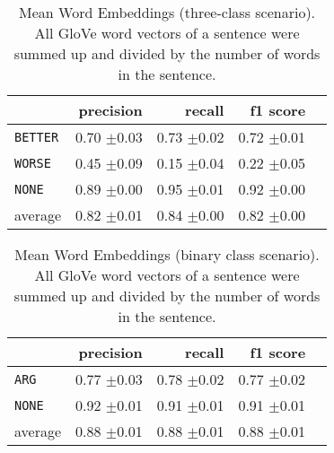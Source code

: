 	\begin{table}[htbp] 
		\centering 
		\caption{Mean Word Embeddings (three-class scenario). All GloVe word vectors of a sentence were summed up and divided by the number of words in the sentence.} 
		\label{  }
		\begin{tabular}{@{}lrrrr@{}}
			\toprule
			        & precision                & recall                   & f1 score                 \\ \midrule 
\texttt	{BETTER}	&	 0.70 \scriptsize{$\pm$0.03} &	 0.73 \scriptsize{$\pm$0.02} &	 0.72 \scriptsize{$\pm$0.01}  \\ 
\texttt	{WORSE}	&	 0.45 \scriptsize{$\pm$0.09} &	 0.15 \scriptsize{$\pm$0.04} &	 0.22 \scriptsize{$\pm$0.05}  \\ 
\texttt	{NONE}	&	 0.89 \scriptsize{$\pm$0.00} &	 0.95 \scriptsize{$\pm$0.01} &	 0.92 \scriptsize{$\pm$0.00}  \\ 
average	&	 0.82 \scriptsize{$\pm$0.01} &	 0.84 \scriptsize{$\pm$0.00} &	 0.82 \scriptsize{$\pm$0.00}  \\ 
			\bottomrule
		\end{tabular}
	\end{table}
	
	\begin{table}[htbp] 
		\centering 
		\caption{Mean Word Embeddings (binary class scenario). All GloVe word vectors of a sentence were summed up and divided by the number of words in the sentence.} 
		\label{  }
		\begin{tabular}{@{}lrrrr@{}}
			\toprule
			        & precision                & recall                   & f1 score                 \\ \midrule 
	\texttt{ARG}	&	 0.77 \scriptsize{$\pm$0.03} &	 0.78 \scriptsize{$\pm$0.02} &	 0.77 \scriptsize{$\pm$0.02}  \\ 
	\texttt{NONE}	&	 0.92 \scriptsize{$\pm$0.01} &	 0.91 \scriptsize{$\pm$0.01} &	 0.91 \scriptsize{$\pm$0.01}  \\ 
average	&	 0.88 \scriptsize{$\pm$0.01} &	 0.88 \scriptsize{$\pm$0.01} &	 0.88 \scriptsize{$\pm$0.01}  \\ 
			\bottomrule
		\end{tabular}
	\end{table}
	
